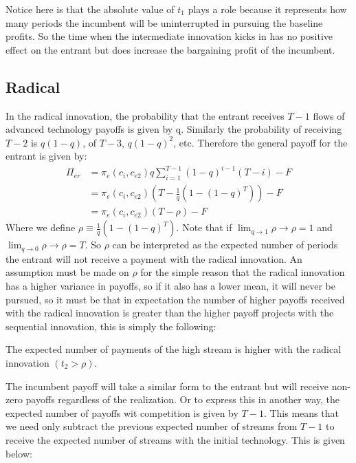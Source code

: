Notice here is that the absolute value of $t_1$ plays a role because it represents how many periods the incumbent will be uninterrupted in pursuing the baseline profits. So the time when the intermediate innovation kicks in has no positive effect on the entrant but does increase the bargaining profit of the incumbent. 
\subsection{Radical}
In the radical innovation, the probability that the entrant receives $T-1$ flows of advanced technology payoffs is given by q. Similarly the probability of receiving $T-2$ is $q(1-q)$, of $T-3$, $q(1-q)^2$, etc. Therefore the general payoff for the entrant is given by:
\begin{align*}
\Pi_{er} & = 
\pi_{e}(c_i,c_{e2}) q \sum_{i=1}^{T-1} (1-q)^{i-1} (T-i) -F \\
&= \pi_{e}(c_i,c_{e2}) \left( T- \frac{1}{q} \left( 1-(1-q)^{T} \right) \right) -F \\
&= \pi_{e}(c_i,c_{e2}) \left( T- \rho \right) -F 
\end{align*}
Where we define $\rho \equiv \frac{1}{q} \left( 1-(1-q)^{T} \right)$. Note that if $\lim_{q \to 1} \rho \rightarrow \rho = 1 $ and $\lim_{q \to 0} \rho \rightarrow \rho = T$. So $\rho$ can be interpreted as the expected number of periods the entrant will not receive a payment with the radical innovation. An assumption must be made on $\rho$ for the simple reason that the radical innovation has a higher variance in payoffs, so if it also has a lower mean, it will never be pursued, so it must be that in expectation the number of higher payoffs received with the radical innovation is greater than the higher payoff projects with the sequential innovation, this is simply the following: 
\newline
\begin{assumption}\label{rho}
The expected number of payments of the high stream is higher with the radical innovation $(t_2>\rho)$. 
\end{assumption}
The incumbent payoff will take a similar form to the entrant but will receive non-zero payoffs regardless of the realization. Or to express this in another way, the expected number of payoffs wit competition is given by $T-1$. This means that we need only subtract the previous expected number of streams from $T-1$ to receive the expected number of streams with the initial technology. This is given below: 
